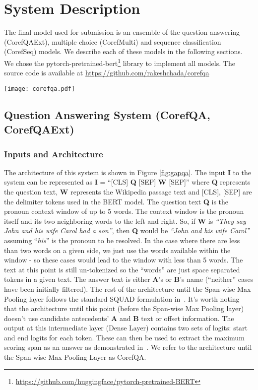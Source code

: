 \documentclass[11pt,a4paper]{article}
\begin{document}
\section{System Description}

The final model used for submission is an ensemble of the question answering (CorefQAExt), multiple choice (CorefMulti) and sequence classification (CorefSeq) models. We describe each of these models in the following sections. We chose the pytorch-pretrained-bert\footnote{\url{https://github.com/huggingface/pytorch-pretrained-BERT}} library to implement all models. The source code is available at \url{https://github.com/rakeshchada/corefqa}

\begin{figure*}[!ht]
  \texttt{[image: corefqa.pdf]}
  \caption{Architecture of CorefQA, CorefQAExt models}
  \label{fig:gapqa}
\end{figure*}

\subsection{Question Answering System (CorefQA, CorefQAExt)}
\subsubsection{Inputs and Architecture}

The architecture of this system is shown in Figure \ref{fig:gapqa}. The input \textbf{I} to the system can be represented as \textbf{I} = ``[CLS] \textbf{Q} [SEP] \textbf{W} [SEP]'' where \textbf{Q} represents the question text, \textbf{W} represents the Wikipedia passage text and [CLS], [SEP] are the delimiter tokens used in the BERT model. The question text \textbf{Q} is the pronoun context window of up to 5 words. The context window is the pronoun itself and its two neighboring words to the left and right. So, if \textbf{W} is \textit{``They say John and his wife Carol had a son''}, then \textbf{Q} would be \textit{``John and his wife Carol''} assuming ``\textit{his}'' is the pronoun to be resolved. In the case where there are less than two words on a given side, we just use the words available within the window - so these cases would lead to the window with less than 5 words. The text at this point is still un-tokenized so the ``words'' are just space separated tokens in a given text. The answer text is either \textbf{A}'s or \textbf{B}'s name (``neither'' cases have been initially filtered). The rest of the architecture until the Span-wise Max Pooling layer follows the standard SQUAD formulation in~\cite{devlin2018bert}. It's worth noting that the architecture until this point (before the Span-wise Max Pooling layer) doesn't use candidate antecedents' \textbf{A} and \textbf{B} text or offset information. The output at this intermediate layer (Dense Layer) contains two sets of logits: start and end logits for each token. These can then be used to extract the maximum scoring span as an answer as demonstrated in~\cite{devlin2018bert}. We refer to the architecture until the Span-wise Max Pooling Layer as CorefQA.
\end{document}
